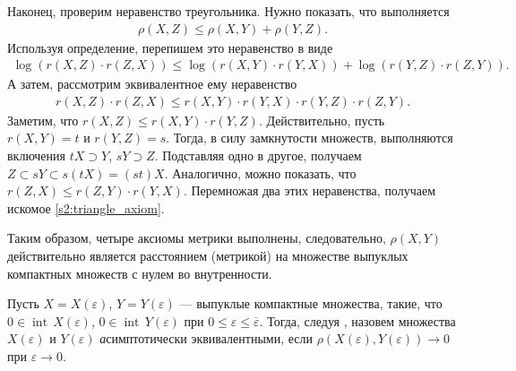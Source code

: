\documentclass[../main.tex]{subfiles}
\begin{document}
Наконец, проверим неравенство треугольника. 
Нужно показать, что выполняется
\begin{gather*}
	\rho(X,Z) \leqslant \rho(X,Y) + \rho(Y,Z).
\end{gather*}
Используя определение, перепишем это неравенство в виде
\begin{gather*}
	\log(r(X,Z) \cdot r(Z,X)) \leqslant \log(r(X,Y) \cdot r(Y,X)) + \log(r(Y,Z) \cdot r(Z,Y)).
\end{gather*}
А затем, рассмотрим эквивалентное ему неравенство
\begin{gather}\label{s2:triangle_axiom}
	r(X,Z) \cdot r(Z,X) \leqslant r(X,Y) \cdot r(Y,X) \cdot r(Y,Z) \cdot r(Z,Y).
\end{gather}
Заметим, что $r(X,Z) \leqslant r(X,Y) \cdot r(Y,Z)$.
Действительно, пусть $ r(X,Y) = t $ и $r(Y,Z) = s$.
Тогда, в силу замкнутости множеств, выполняются включения $tX \supset Y$, $sY \supset Z$.
Подставляя одно в другое, получаем $Z \subset sY \subset s(tX) = (st) X$.
Аналогично, можно показать, что $r(Z,X) \leqslant r(Z,Y) \cdot r(Y,X)$. 
Перемножая два этих неравенства, получаем искомое \eqref{s2:triangle_axiom}.

Таким образом, четыре аксиомы метрики выполнены, следовательно, $\rho(X,Y)$ действительно является расстоянием (метрикой) на множестве выпуклых компактных множеств с нулем во внутренности.


Пусть $ X = X(\varepsilon) $, $ Y = Y(\varepsilon) $ --- выпуклые компактные множества, такие, что $ 0 \in \operatorname{int}\,X(\varepsilon) $, $ 0 \in \operatorname{int}\,Y(\varepsilon) $ при $0 \leqslant \varepsilon \leqslant \overline{\varepsilon} $.
Тогда, следуя \cite{Ovs}, назовем множества $ X(\varepsilon) $ и $ Y(\varepsilon) $ {\textit асимптотически эквивалентными}, если $ \rho (X(\varepsilon), Y(\varepsilon)) \rightarrow 0 $ при $\varepsilon \rightarrow 0 $.
\end{document}
